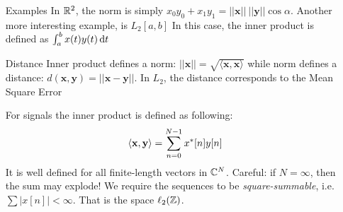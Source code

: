 \documentclass[11pt,a4paper]{article}
\begin{document}
\begin{itemize}
\begin{multicols}{2}
\begin{itemize}
		      \end{itemize}
	      \end{multicols}
	\item[Examples] In $\R^2$, the norm is simply $x_0y_0 + x_1y_1 = ||\mathbf{x}||\ ||\mathbf{y}|| \cos\alpha$. Another more interesting example, is $L_2[a,b]$ In this case, the inner product is defined as $\int_a^b x(t)y(t)\deriv{t}$
	\item[Distance]Inner product defines a norm: $||\mathbf{x}|| = \sqrt{\langle\mathbf{x},\mathbf{x}\rangle}$ while norm defines a distance: $d(\mathbf{x},\mathbf{y}) = ||\mathbf{x}- \mathbf{y}||$. In $L_2$, the distance corresponds to the Mean Square Error
	\item[For signals] the inner product is defined as following:
	      \begin{equation}
		      \langle\mathbf{x},\mathbf{y}\rangle = \somme{N-1}{n=0}x^*[n]y[n]
	      \end{equation}
	      It is well defined for all finite-length vectors in $\C^N$. Careful: if $N = \infty$, then the sum may explode! We require the sequences to be \textit{square-summable}, i.e. $\sum|x[n]| < \infty$. That is the space $\ell_2(\Z)$.
\end{itemize}
\end{document}
